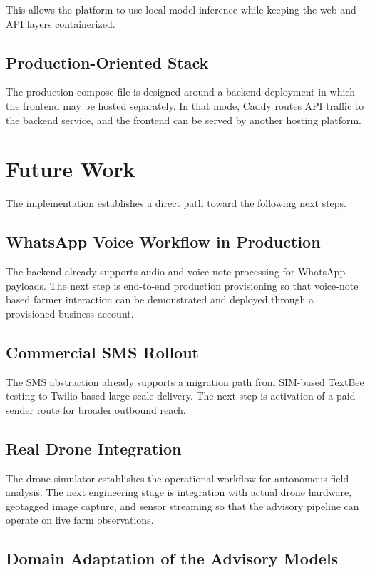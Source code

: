 \documentclass[11pt,a4paper]{article}
\begin{document}
This allows the platform to use local model inference while keeping the web and API layers containerized.

\subsection{Production-Oriented Stack}

The production compose file is designed around a backend deployment in which the frontend may be hosted separately. In that mode, Caddy routes API traffic to the backend service, and the frontend can be served by another hosting platform.

\section{Future Work}

The implementation establishes a direct path toward the following next steps.

\subsection{WhatsApp Voice Workflow in Production}

The backend already supports audio and voice-note processing for WhatsApp payloads. The next step is end-to-end production provisioning so that voice-note based farmer interaction can be demonstrated and deployed through a provisioned business account.

\subsection{Commercial SMS Rollout}

The SMS abstraction already supports a migration path from SIM-based TextBee testing to Twilio-based large-scale delivery. The next step is activation of a paid sender route for broader outbound reach.

\subsection{Real Drone Integration}

The drone simulator establishes the operational workflow for autonomous field analysis. The next engineering stage is integration with actual drone hardware, geotagged image capture, and sensor streaming so that the advisory pipeline can operate on live farm observations.

\subsection{Domain Adaptation of the Advisory Models}
\end{document}
